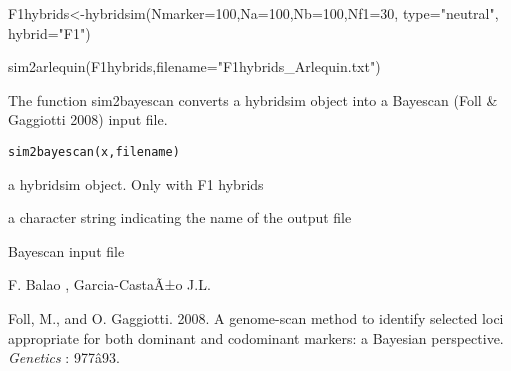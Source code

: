 \documentclass[letterpaper]{book}
\begin{document}
%
\begin{Examples}
\begin{ExampleCode}
F1hybrids<-hybridsim(Nmarker=100,Na=100,Nb=100,Nf1=30, type="neutral", hybrid="F1")

sim2arlequin(F1hybrids,filename="F1hybrids_Arlequin.txt")
\end{ExampleCode}
\end{Examples}
%
\begin{Description}\relax
The function sim2bayescan converts a hybridsim object into a Bayescan (Foll \& Gaggiotti 2008) input file. 

\end{Description}
%
\begin{Usage}
\begin{verbatim}
sim2bayescan(x,filename)

\end{verbatim}
\end{Usage}
%
\begin{Arguments}
\begin{ldescription}

\item[\code{x}] 
a hybridsim object. Only with F1 hybrids

\item[\code{filename}] 
a character string indicating the name of the output file
\end{ldescription}
\end{Arguments}
%
\begin{Value}
Bayescan input file
\end{Value}
%
\begin{Author}\relax
F. Balao , Garcia-CastaÃ±o J.L.
\end{Author}
%
\begin{References}\relax
Foll, M., and O. Gaggiotti. 2008. A genome-scan method to identify selected loci appropriate for both dominant and codominant markers: a Bayesian perspective. \emph{Genetics} : 977â93. 
\end{References}
%
\begin{SeeAlso}\relax
{}
\end{SeeAlso}
\end{document}
